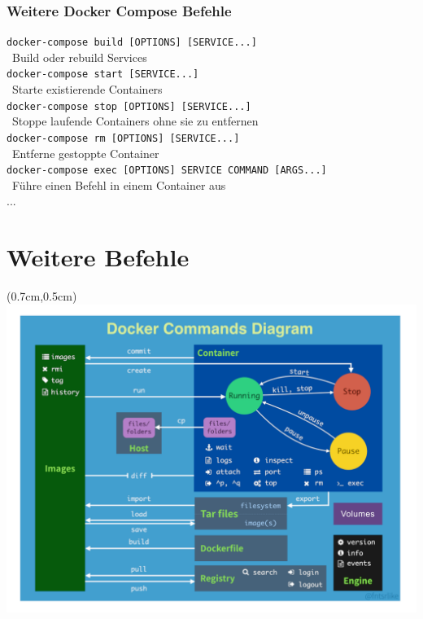 \documentclass[22pt]{beamer}
\newcommand{\code}[1]{\colorbox{darkgray!20}{\texttt{#1}}}
\begin{document}
\begin{frame}[fragile]
    \frametitle{Weitere Docker Compose Befehle}
    \code{docker-compose build [OPTIONS] [SERVICE...]}\\
    \-  \ Build oder rebuild Services \\

    \code{docker-compose start [SERVICE...]}\\
    \-  \ Starte existierende Containers \\

    \code{docker-compose stop [OPTIONS] [SERVICE...]}\\
    \-  \ Stoppe laufende Containers ohne sie zu entfernen \\

    \code{docker-compose rm [OPTIONS] [SERVICE...]}\\
    \-  \ Entferne gestoppte Container \\

    \code{docker-compose exec [OPTIONS] SERVICE COMMAND [ARGS...]}\\
    \-  \ Führe einen Befehl in einem Container aus \\

    ...
\end{frame}

\section{Weitere Befehle}
\begin{frame}[t]
    \begin{textblock*}{\paperwidth}(0.7cm,0.5cm) %
        \includegraphics[width=0.9\paperwidth]{Bilder/Commands.png}
    \end{textblock*}
\end{frame} 
\end{document}
